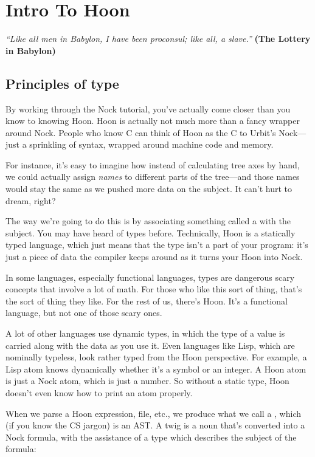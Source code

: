 \chapter{Intro To Hoon}

\emph{``Like all men in Babylon, I have been proconsul; like all, a slave.''}
\textbf{(The Lottery in Babylon)}

\section{Principles of type}

By working through the Nock tutorial, you've actually come closer
than you know to knowing Hoon.  Hoon is actually not much more
than a fancy wrapper around Nock. People who know C can think of
Hoon as the C to Urbit's Nock---just a sprinkling of syntax,
wrapped around machine code and memory.

For instance, it's easy to imagine how instead of calculating
tree axes by hand, we could actually assign \emph{names} to different
parts of the tree---and those names would stay the same as we
pushed more data on the subject.  It can't hurt to dream, right?

The way we're going to do this is by associating something called
a  with the subject.  You may have heard of types before.
Technically, Hoon is a statically typed language, which just
means that the type isn't a part of your program: it's just a
piece of data the compiler keeps around as it turns your Hoon
into Nock.

In some languages, especially functional languages, types are
dangerous scary concepts that involve a lot of math.  For those
who like this sort of thing, that's the sort of thing they like.
For the rest of us, there's Hoon. It's a functional language, but
not one of those scary ones.

A lot of other languages use dynamic types, in which the type of
a value is carried along with the data as you use it.  Even
languages like Lisp, which are nominally typeless, look rather
typed from the Hoon perspective.  For example, a Lisp atom knows
dynamically whether it's a symbol or an integer.  A Hoon atom is
just a Nock atom, which is just a number.  So without a static
type, Hoon doesn't even know how to print an atom properly.

When we parse a Hoon expression, file, etc., we produce what we
call a , which (if you know the CS jargon) is an AST.  A
twig is a noun that's converted into a Nock formula, with
the assistance of a type which describes the subject of the
formula:

